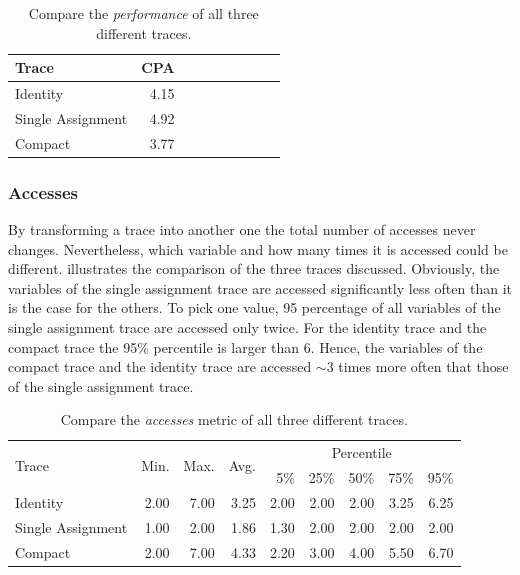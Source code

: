 \documentclass[onecolumn, openright, master, english, signatures]{dbrgrptt}
\begin{document}
\begin{table}[!ht]
  \centering
  \begin{tabular}{lrrrrrrrr}
    \hline
    Trace & \ac{CPA} \tabularnewline
    \hline
    Identity          & 4.15 \\
    Single Assignment & 4.92 \\
    Compact           & 3.77 \\
    \hline
  \end{tabular}
  \caption{Compare the \emph{performance} of all three different \ac{trace}s.}
  \label{tab:summarizing-example-performance}
\end{table}

\subsubsection{Accesses}

By transforming a \ac{trace} into another one the total number of accesses never changes.
Nevertheless, which variable and how many times it is accessed could be different.
 illustrates the comparison of the three \ac{trace}s discussed.
Obviously, the variables of the single assignment \ac{trace} are accessed significantly less often than it is the case for the others.
To pick one value, 95 percentage of all variables of the single assignment \ac{trace} are accessed only twice.
For the identity \ac{trace} and the compact \ac{trace} the 95\% percentile is larger than 6.
Hence, the variables of the compact \ac{trace} and the identity \ac{trace} are accessed $\sim3$ times more often that those of the single assignment \ac{trace}.

\begin{table}[!ht]
  \centering
  \begin{tabular}{lrrrrrrrr}
    \hline
    \multirow{2}{*}{Trace} & \multirow{2}{*}{Min.} & \multirow{2}{*}{Max.} & \multirow{2}{*}{Avg.} & \multicolumn{5}{c}{Percentile} \tabularnewline
    & & & & 5\% & 25\% & 50\% & 75\% & 95\% \tabularnewline
    \hline
    Identity          & 2.00 & 7.00 & 3.25 & 2.00 & 2.00 & 2.00 & 3.25 & 6.25 \\
    Single Assignment & 1.00 & 2.00 & 1.86 & 1.30 & 2.00 & 2.00 & 2.00 & 2.00 \\
    Compact           & 2.00 & 7.00 & 4.33 & 2.20 & 3.00 & 4.00 & 5.50 & 6.70 \\
    \hline
  \end{tabular}
  \caption{Compare the \emph{accesses} metric of all three different \ac{trace}s.}
  \label{tab:summarizing-example-metrics-overview-accesses}
\end{table}
\end{document}
